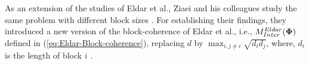 As an extension of the studies of Eldar et al., Ziaei and his colleagues study the same problem with different block sizes \cite{Ziaei2010}. 
For establishing their findings, they introduced a new version of the block-coherence of Eldar et al., i.e., $M^{Eldar}_{Inter}(\boldsymbol{\Phi})$ defined in (\ref{eq:Eldar-Block-coherence}), replacing $d$ by $\max_{i , j {\neq} i} \sqrt{d_i d_j}$, where, $d_i$ is the length of block $i$ 
\cite{Ziaei2010}.